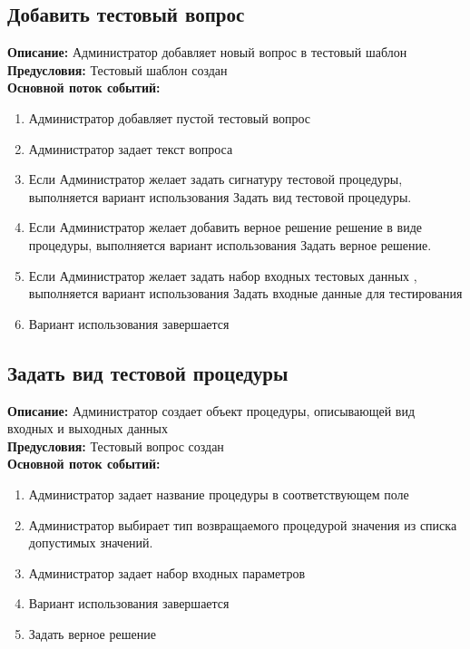 \documentclass{article}
\begin{document}
    \subsection{Добавить тестовый вопрос}
    \textbf{Описание:} Администратор добавляет новый вопрос в тестовый шаблон\\
    \textbf{Предусловия:} Тестовый шаблон создан\\
    \textbf{Основной поток событий:}
    \begin{enumerate}
        \item Администратор добавляет пустой тестовый вопрос
        \item Администратор задает текст вопроса
        \item Если Администратор желает задать сигнатуру тестовой процедуры, выполняется вариант использования Задать вид тестовой процедуры.
        \item Если Администратор желает добавить верное решение решение в виде процедуры, выполняется вариант использования Задать верное решение.
        \item Если Администратор желает задать набор входных тестовых данных , выполняется вариант использования Задать входные данные для тестирования
        \item Вариант использования завершается
    \end{enumerate}


    \subsection{Задать вид тестовой процедуры}
    \textbf{Описание:} Администратор создает объект процедуры, описывающей вид входных и выходных данных\\
    \textbf{Предусловия:} Тестовый вопрос создан\\
    \textbf{Основной поток событий:}
    \begin{enumerate}
        \item Администратор задает название процедуры в соответствующем поле
        \item Администратор выбирает тип возвращаемого процедурой значения из списка допустимых значений.
        \item Администратор задает набор входных параметров
        \item Вариант использования завершается
        \item Задать верное решение
    \end{enumerate}
    
\end{document}
